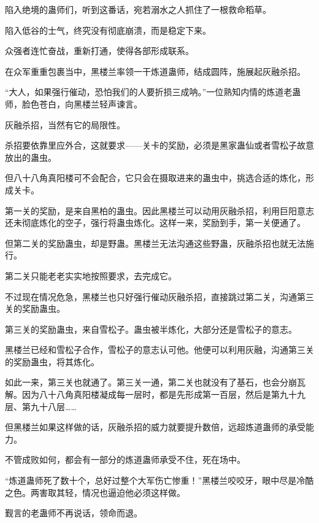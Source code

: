 \begin{this_body}
陷入绝境的蛊师们，听到这番话，宛若溺水之人抓住了一根救命稻草。

陷入低谷的士气，终究没有彻底崩溃，而是稳定下来。

众强者连忙奋战，重新打通，使得各部形成联系。

在众军重重包裹当中，黑楼兰率领一干炼道蛊师，结成圆阵，施展起灰融杀招。

“大人，如果强行催动，恐怕我们的人要折损三成呐。”一位熟知内情的炼道老蛊师，脸色苍白，向黑楼兰轻声谏言。

灰融杀招，当然有它的局限性。

杀招要依靠里应外合，这就要求——关卡的奖励，必须是黑家蛊仙或者雪松子故意放出的蛊虫。

但八十八角真阳楼可不会配合，它只会在摄取进来的蛊虫中，挑选合适的炼化，形成关卡。

第一关的奖励，是来自黑柏的蛊虫。因此黑楼兰可以动用灰融杀招，利用巨阳意志还未彻底炼化的空子，强行将蛊虫炼化。这样一来，奖励到手，第一关便通了。

但第二关的奖励蛊虫，却是野蛊。黑楼兰无法沟通这些野蛊，灰融杀招也就无法施行。

第二关只能老老实实地按照要求，去完成它。

不过现在情况危急，黑楼兰也只好强行催动灰融杀招，直接跳过第二关，沟通第三关的奖励蛊虫。

第三关的奖励蛊虫，来自雪松子。蛊虫被半炼化，大部分还是雪松子的意志。

黑楼兰已经和雪松子合作，雪松子的意志认可他。他便可以利用灰融，沟通第三关的奖励蛊虫，将其炼化。

如此一来，第三关也就通了。第三关一通，第二关也就没有了基石，也会分崩瓦解。因为八十八角真阳楼凝成每一层时，都是先形成第一百层，然后是第九十九层、第九十八层……

但黑楼兰如果这样做的话，灰融杀招的威力就要提升数倍，远超炼道蛊师的承受能力。

不管成败如何，都会有一部分的炼道蛊师承受不住，死在场中。

“炼道蛊师死了数十个，总好过整个大军伤亡惨重！”黑楼兰咬咬牙，眼中尽是冷酷之色。两害取其轻，情况也逼迫他必须这样做。

觐言的老蛊师不再说话，领命而退。

\end{this_body}

